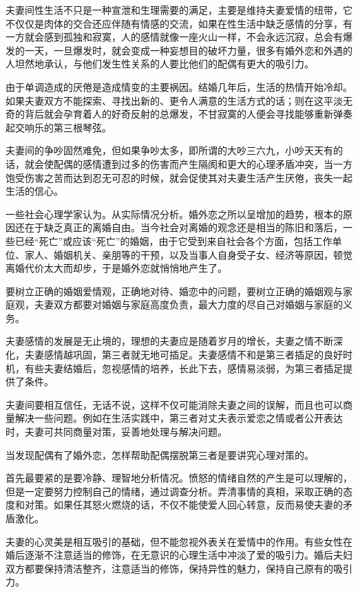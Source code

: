 \documentclass[12pt,UTF8]{ctexbook}
\begin{document}
夫妻间性生活不只是一种宣泄和生理需要的满足，主要是维持夫妻爱情的纽带，它不仅仅是肉体的交合还应伴随有情感的交流，如果在性生活中缺乏感情的分享，有一方就会感到孤独和寂寞，人的感情就像一座火山一样，不会永远沉寂，总会有爆发的一天，一旦爆发时，就会变成一种妄想目的破坏力量，很多有婚外恋和外遇的人坦然地承认，与他们发生性关系的人要比他们的配偶有更大的吸引力。

由于单调造成的厌倦是造成情变的主要祸因。结婚几年后，生活的热情开始冷却。如果夫妻双方不能探索、寻找出新的、更令人满意的生活方式的话；则在这平淡无奇的背后就会孕育着人的好奇反射的总爆发，不甘寂寞的人便会寻找能够重新弹奏起交响乐的第三根琴弦。

夫妻间的争吵固然难免，但如果争吵太多，即所谓的大吵三六九，小吵天天有的话，就会使配偶的感情遭到过多的伤害而产生隔阂和更大的心理矛盾冲突，当一方饱受伤害之苦而达到忍无可忍的时候，就会促使其对夫妻生活产生厌倦，丧失一起生活的信心。

一些社会心理学家认为。从实际情况分析。婚外恋之所以呈增加的趋势，根本的原因还在于缺乏真正的离婚自由。当今社会对离婚的观念还是相当的陈旧和落后，一些已经“死亡”或应该“死亡”的婚姻，由于它受到来自社会各个方面，包括工作单位、家人、婚姻机关、亲朋等的干预，以及当事人自身受子女、经济等原因，顿觉离婚代价太大而却步，于是婚外恋就悄悄地产生了。

要树立正确的婚姻爱情观，正确地对待、婚恋中的问题，要树立正确的婚姻观与家庭观，夫妻双方都要对婚姻与家庭高度负责，最大力度的尽自己对婚姻与家庭的义务。

夫妻感情的发展是无止境的，理想的夫妻应是随着岁月的增长，夫妻之情不断深化，夫妻感情越巩固，第三者就无地可插足。夫妻感情不和是第三者插足的良好时机，有些夫妻结婚后，忽视感情的培养，长此下去，感情易淡弱，为第三者插足提供了条件。

夫妻间要相互信任，无话不说，这样不仅可能消除夫妻之间的误解，而且也可以商量解决一些问题。例如在生活实践中，第三者对丈夫表示爱恋之情或者公开表达时，夫妻可共同商量对策，妥善地处理与解决问题。

当发现配偶有了婚外恋，怎样帮助配偶摆脱第三者是要讲究心理对策的。

首先最要紧的是要冷静、理智地分析情况。愤怒的情绪自然的产生是可以理解的，但是一定要努力控制自己的情绪，通过调查分析。弄清事情的真相，采取正确的态度和对策。如果任其怒火燃烧的话，不仅不能使爱人回心转意，反而易使夫妻的矛盾激化。

夫妻的心灵美是相互吸引的基础，但不能忽视外表关在爱情中的作用。有些女性在婚后逐渐不注意适当的修饰，在无意识的心理生活中冲淡了爱的吸引力。婚后夫妇双方都要保持清洁整齐，注意适当的修饰，保持异性的魅力，保持自己原有的吸引力。
\end{document}
